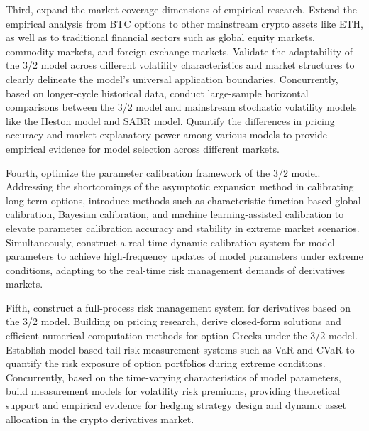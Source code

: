 Third, expand the market coverage dimensions of empirical research. Extend the empirical analysis from BTC options to other mainstream crypto assets like ETH, as well as to traditional financial sectors such as global equity markets, commodity markets, and foreign exchange markets. Validate the adaptability of the 3/2 model across different volatility characteristics and market structures to clearly delineate the model's universal application boundaries. Concurrently, based on longer-cycle historical data, conduct large-sample horizontal comparisons between the 3/2 model and mainstream stochastic volatility models like the Heston model and SABR model. Quantify the differences in pricing accuracy and market explanatory power among various models to provide empirical evidence for model selection across different markets.

Fourth, optimize the parameter calibration framework of the 3/2 model. Addressing the shortcomings of the asymptotic expansion method in calibrating long-term options, introduce methods such as characteristic function-based global calibration, Bayesian calibration, and machine learning-assisted calibration to elevate parameter calibration accuracy and stability in extreme market scenarios. Simultaneously, construct a real-time dynamic calibration system for model parameters to achieve high-frequency updates of model parameters under extreme conditions, adapting to the real-time risk management demands of derivatives markets.

Fifth, construct a full-process risk management system for derivatives based on the 3/2 model. Building on pricing research, derive closed-form solutions and efficient numerical computation methods for option Greeks under the 3/2 model. Establish model-based tail risk measurement systems such as VaR and CVaR to quantify the risk exposure of option portfolios during extreme conditions. Concurrently, based on the time-varying characteristics of model parameters, build measurement models for volatility risk premiums, providing theoretical support and empirical evidence for hedging strategy design and dynamic asset allocation in the crypto derivatives market.